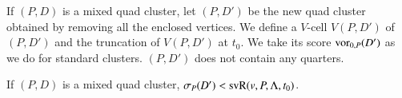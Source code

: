 

\smallskip
If $(P,D)$ is a mixed quad cluster, let $(P,D')$ be the new quad
cluster obtained by removing all the enclosed vertices.  We define
a $V$-cell $V(P,D')$ of $(P,D')$ and the truncation of $V(P,D')$
at $t_0$. We take its score ${\operatorname{vor}}_{0,P}(D')$  as we do for
standard clusters.  $(P,D')$ does not contain any quarters.

\begin{lemma} \label{lemma:mixed-vor0}
If $(P,D)$ is a mixed quad cluster, $\sigma_P(D') <
{\operatorname{svR}}(v,P,\Lambda,t_0)$.  
\end{lemma}

